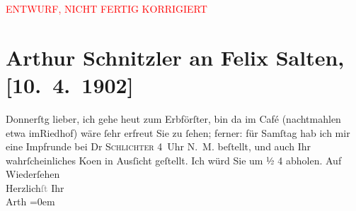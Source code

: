 
\begin{center}
            \textcolor{red}{ENTWURF, NICHT FERTIG KORRIGIERT}
                      \end{center}
            
         
         \newcommand{\erwaehntePersonen}{Personen: Felix Salten, Felix Schlichter}
         \newcommand{\erwaehnteOrte}{Orte: Riedhof, Wien}
         \newcommand{\erwaehnteWerke}{Werke: Der Erbförster}
               \section[Arthur Schnitzler an Felix Salten, {[}10. 4. 1902{]}]{ Arthur Schnitzler an Felix Salten, {[}10. 4. 1902{]}}\nopagebreak{}\rehead{ }\begin{ledgroupsized}[t]{13cm}\normalsize\beginnumbering \toendnotes[C]{\smallbreak\pagebreak[2]} 
\pstart
           \raggedleft{}{\pb}Donnerſtg\pend
           \pstart
           lieber, ich gehe heut zum Erbförſter,
               bin da{\geminationn} im Café (nachtmahlen etwa imRiedhof) wäre ſehr erfreut Sie zu ſehen; ferner: für Samſtag hab ich
               mir eine Impfrunde {\pb}bei Dr \textsc{Schlichter}{ }4 Uhr N. M. beſtellt, und auch Ihr wahrſcheinliches Ko{\geminationm}en in Ausſicht geſtellt. Ich würd Sie um ½ 4 abholen. \pend
           \pstart
           Auf Wiederſehen {\\[\baselineskip]}Herzlich\textcolor{gray}{ſt} Ihr {\\[\baselineskip]}\spacefill\mbox{Arth}\pend
           \leftskip=0em{}
         
         \endnumbering{}\end{ledgroupsized}\begin{anhang}\end{anhang}\newcommand{\dateiname}{L02973}\newcommand{\titel}{Arthur Schnitzler an Felix Salten, [10. 4. 1902]}\newcommand{\editorInnen}{Martin Anton Müller und Laura Untner}
      